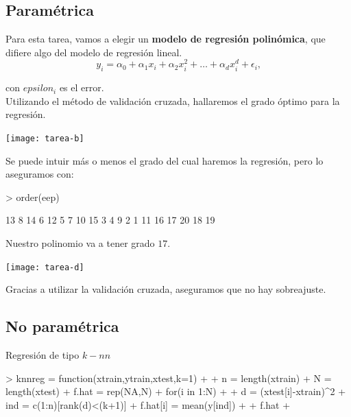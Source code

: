 \documentclass[a4paper,12pt]{article}
\begin{document}
\subsection{Paramétrica}

Para esta tarea, vamos a elegir un \textbf{modelo de regresi\'on polin\'omica}, que difiere algo del modelo de regresi\'on lineal. \\

\begin{equation*}
y_i = \alpha_0 + \alpha_1 x_i + \alpha_2 x_i^2 +  \dots + \alpha_d x_i^d + \epsilon_i\text{,}
\end{equation*}

con $epsilon_i$ es el error.\\

Utilizando el m\'etodo de validaci\'on cruzada, hallaremos el grado \'optimo para la regresi\'on.

\begin{Schunk}
\end{Schunk}
\texttt{[image: tarea-b]}

Se puede intuir m\'as o menos el grado del cual haremos la regresi\'on, pero lo aseguramos con:

\begin{Schunk}
\begin{Sinput}
> order(eep)
\end{Sinput}
\begin{Soutput}
 [1] 13  8 14  6 12  5  7 10 15  3  4  9  2  1 11 16 17 20 18 19
\end{Soutput}
\end{Schunk}

Nuestro polinomio va a tener grado $17$. 

\texttt{[image: tarea-d]}

Gracias a utilizar la validaci\'on cruzada, aseguramos que no hay sobreajuste. 


\subsection{No paramétrica}

Regresi\'on de tipo $k-nn$

\begin{Schunk}
\begin{Sinput}
> knnreg = function(xtrain,ytrain,xtest,k=1)
+   {
+     n = length(xtrain)
+     N = length(xtest)
+     f.hat = rep(NA,N)
+     for(i in 1:N)
+       {
+         d = (xtest[i]-xtrain)^2
+         ind = c(1:n)[rank(d)<(k+1)]
+         f.hat[i] = mean(y[ind])
+       }
+     f.hat
+   }
\end{Sinput}
\end{Schunk}
\end{document}

